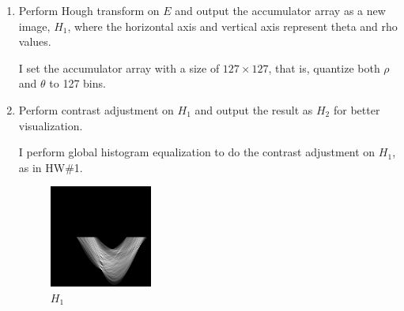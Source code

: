 \documentclass[12pt,a4paper,notitlepage,oneside,amsmath,amssymb]{article}
\begin{document}
\begin{CJK*}{UTF8}{bkai}
\begin{enumerate}[label=(\alph*)]
		\item Perform Hough transform on \(E\) and output the accumulator array as a new image, \(H_1\), where the horizontal axis and vertical axis represent theta and rho values.

		      I set the accumulator array with a size of \(127\times127\), that is, quantize both \(\rho\) and \(\theta\) to 127 bins.

		\item Perform contrast adjustment on \(H_1\) and output the result as \(H_2\) for better visualization.

		      I perform global histogram equalization to do the contrast adjustment on \(H_1\), as in HW\#1.

		      \begin{figure}[hbt!]
			      \centering
			      \begin{minipage}{.4\textwidth}
				      \centering
				      \includegraphics[width=.85\linewidth]{image_H1}
				      \caption*{\(H_1\)}
			      \end{minipage}%
			      \begin{minipage}{.4\textwidth}
				      \centering

\end{minipage}
\end{figure}
\end{enumerate}
\end{CJK*}
\end{document}
